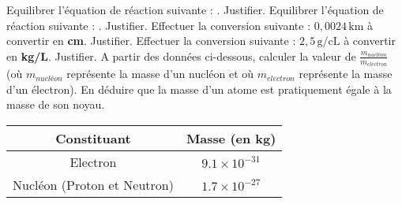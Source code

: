 \documentclass{exam}
\begin{document}
\begin{questions}
  \question[1] Equilibrer l'équation de réaction suivante : . Justifier.
  \question[1] Equilibrer l'équation de réaction suivante : . Justifier.
  \question[1] Effectuer la conversion suivante : \( 0,0024 \, \mathrm{km} \) à convertir en \textbf{cm}. Justifier.
  \question[1] Effectuer la conversion suivante : \( 2,5 \, \mathrm{g/cL} \) à convertir en  \textbf{kg/L}. Justifier.
  \question[2] A partir des données ci-dessous, calculer la valeur de $\frac{m_{nucléon}}{m_{electron}}$ (où $m_{nucléon}$ représente la masse d'un nucléon et où $m_{electron}$ représente la masse d'un électron). En déduire que la masse d'un atome est pratiquement égale à la masse de son noyau.

  \begin{center}
    \begin{tabular}{SS}
      \toprule
      {Constituant} & {Masse (en \si{kg})} \\
      \midrule
      {Electron} & {\(9.1 \times 10^{-31}\)} \\
      {Nucléon (Proton et Neutron)} & {\(1.7 \times 10^{-27}\)} \\
      \bottomrule
    \end{tabular}
  \end{center}
\end{questions}
\end{document}
